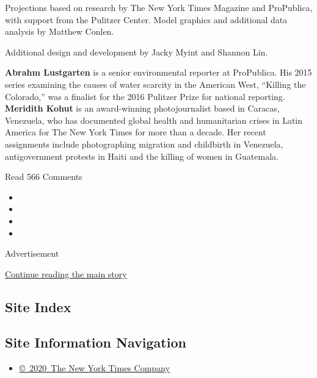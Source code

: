 Projections based on research by The New York Times Magazine and
ProPublica, with support from the Pulitzer Center. Model graphics and
additional data analysis by Matthew Conlen.

Additional design and development by Jacky Myint and Shannon Lin.

\textbf{Abrahm Lustgarten} is a senior environmental reporter at
ProPublica. His 2015 series examining the causes of water scarcity in
the American West, ``Killing the Colorado,'' was a finalist for the 2016
Pulitzer Prize for national reporting. \textbf{Meridith Kohut} is an
award-winning photojournalist based in Caracas, Venezuela, who has
documented global health and humanitarian crises in Latin America for
The New York Times for more than a decade. Her recent assignments
include photographing migration and childbirth in Venezuela,
antigovernment protests in Haiti and the killing of women in Guatemala.

Read 566 Comments

\begin{itemize}
\item
\item
\item
\item
\end{itemize}

Advertisement

\protect\hyperlink{after-bottom}{Continue reading the main story}

\hypertarget{site-index}{%
\subsection{Site Index}\label{site-index}}

\hypertarget{site-information-navigation}{%
\subsection{Site Information
Navigation}\label{site-information-navigation}}

\begin{itemize}
\tightlist
\item
  \href{https://help.nytimes.com/hc/en-us/articles/115014792127-Copyright-notice}{©~2020~The
  New York Times Company}
\end{itemize}

